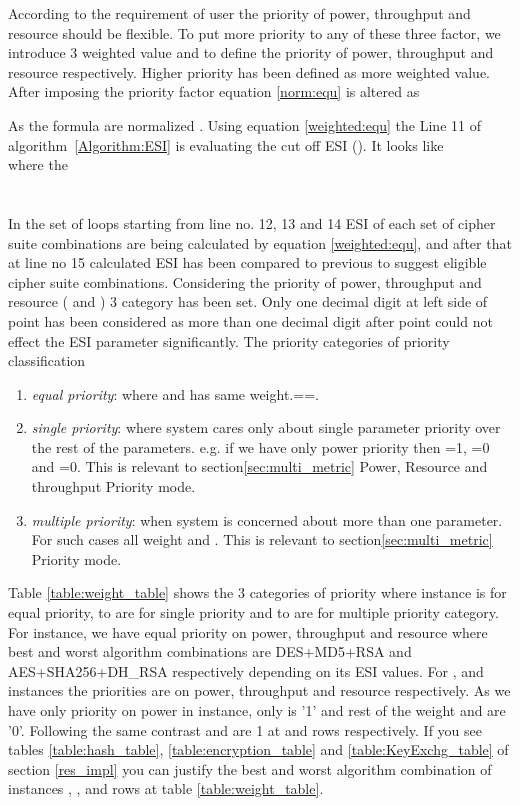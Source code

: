 \documentclass[3p,times]{elsarticle}
\begin{document}
According to the requirement of user the priority of power, throughput and resource should be flexible. To put more priority to any of these three factor, we introduce 3 weighted value  and  to define the priority of power, throughput and resource respectively. Higher priority has been defined as more weighted value. After imposing the priority factor equation \ref{norm:equ} is altered as  

As the formula are normalized . Using equation \ref{weighted:equ} the Line 11 of algorithm~\ref{Algorithm:ESI} is evaluating the cut off ESI (). It looks like\\

where the \\
\\
\\

In the  set of loops starting from line no. 12, 13 and 14 ESI of each set of cipher suite combinations are being calculated by equation \ref{weighted:equ}, and after that at line no 15 calculated ESI has been compared to previous  to suggest eligible cipher suite combinations.
Considering the priority of power, throughput and resource ( and ) 3 category has been set. Only one decimal digit at left side of point has been considered as more than one decimal digit after point could not effect the ESI parameter significantly. The priority categories of priority classification
\begin{enumerate} 
\item \textit{equal priority}: where  and  has same weight.==.
\item \textit{single priority}: where system cares only about single parameter priority over the rest of the parameters. e.g. if we have only power priority then =1, =0 and =0. This is relevant to section\ref{sec:multi_metric} Power, Resource and throughput Priority mode.
\item \textit{multiple priority}: when system is concerned about more than one parameter. For such cases all weight  and .  This is relevant to section\ref{sec:multi_metric} Priority mode.
\end{enumerate}
Table \ref{table:weight_table} shows the 3 categories of priority where  instance is for equal priority,  to  are for single priority and  to  are for multiple priority category. For   instance, we have equal priority on power, throughput and resource where best and worst algorithm combinations are  DES+MD5+RSA and AES+SHA256+DH\_RSA respectively depending on its ESI values. For ,  and  instances the priorities are on power, throughput and resource respectively. As we have only priority on power in  instance, only  is '1' and rest of the weight  and  are '0'. Following the same contrast  and  are 1 at   and  rows respectively. If you see tables \ref{table:hash_table}, \ref{table:encryption_table} and \ref{table:KeyExchg_table} of section \ref{res_impl} you can justify the best and worst algorithm combination of instances
, ,  and  rows at table \ref{table:weight_table}. 
\end{document}
